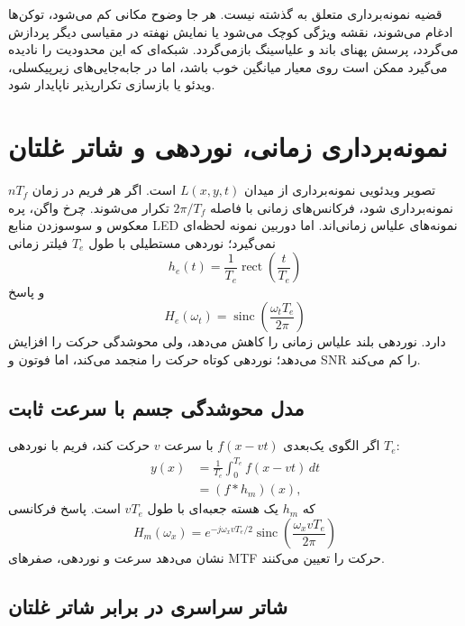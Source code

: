 \documentclass[12pt,openany,oneside]{book}
\newcommand{\sinc}{\operatorname{sinc}}
\begin{document}
\begin{futurebox}
قضیه نمونه‌برداری متعلق به گذشته نیست. هر جا وضوح مکانی کم می‌شود، توکن‌ها ادغام می‌شوند،
نقشه ویژگی کوچک می‌شود یا نمایش نهفته در مقیاسی دیگر پردازش می‌گردد، پرسش پهنای باند و علیاسینگ
بازمی‌گردد. شبکه‌ای که این محدودیت را نادیده می‌گیرد ممکن است روی معیار میانگین خوب باشد، اما در
جابه‌جایی‌های زیرپیکسلی، ویدئو یا بازسازی تکرارپذیر ناپایدار شود.
\end{futurebox}


\section{نمونه‌برداری زمانی، نوردهی و شاتر غلتان}

تصویر ویدئویی نمونه‌برداری از میدان \(L(x,y,t)\) است. اگر هر فریم در زمان \(nT_f\) نمونه‌برداری
شود، فرکانس‌های زمانی با فاصله \(2\pi/T_f\) تکرار می‌شوند. چرخ واگن، پره معکوس و سوسوزدن منابع
LED نمونه‌های علیاس زمانی‌اند. اما دوربین نمونه لحظه‌ای نمی‌گیرد؛ نوردهی مستطیلی با طول \(T_e\)
فیلتر زمانی
\begin{equation}
h_e(t)=\frac1{T_e}\operatorname{rect}\!\left(\frac{t}{T_e}\right)
\end{equation}
و پاسخ
\begin{equation}
H_e(\omega_t)=\sinc\!\left(\frac{\omega_tT_e}{2\pi}\right)
\end{equation}
دارد. نوردهی بلند علیاس زمانی را کاهش می‌دهد، ولی محوشدگی حرکت را افزایش می‌دهد؛ نوردهی کوتاه
حرکت را منجمد می‌کند، اما فوتون و SNR را کم می‌کند.

\subsection{مدل محوشدگی جسم با سرعت ثابت}

اگر الگوی یک‌بعدی \(f(x-vt)\) با سرعت \(v\) حرکت کند، فریم با نوردهی \(T_e\):
\begin{align}
y(x)&=\frac1{T_e}\int_0^{T_e}f(x-vt)\,dt\\
&=(f*h_m)(x),
\end{align}
که \(h_m\) یک هسته جعبه‌ای با طول \(vT_e\) است. پاسخ فرکانسی
\begin{equation}
H_m(\omega_x)=e^{-j\omega_xvT_e/2}
\sinc\!\left(\frac{\omega_xvT_e}{2\pi}\right)
\end{equation}
نشان می‌دهد سرعت و نوردهی، صفرهای MTF حرکت را تعیین می‌کنند.

\subsection{شاتر سراسری در برابر شاتر غلتان}
\end{document}
